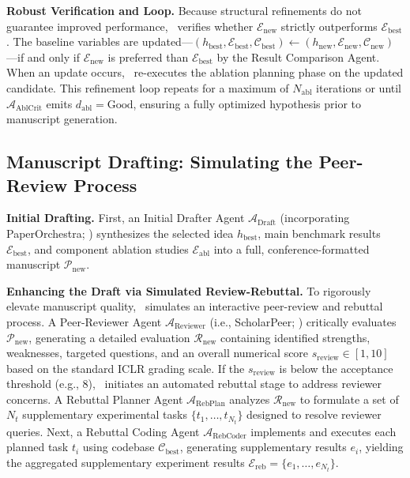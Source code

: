 \noindent\textbf{Robust Verification and Loop.}
Because structural refinements do not guarantee improved performance, \sname~verifies whether $\mathcal{E}_{\mathrm{new}}$ strictly outperforms $\mathcal{E}_{\mathrm{best}}$.
The baseline variables are updated—$(h_{\mathrm{best}}, \mathcal{E}_{\mathrm{best}}, \mathcal{C}_{\mathrm{best}}) \leftarrow (h_{\mathrm{new}}, \mathcal{E}_{\mathrm{new}}, \mathcal{C}_{\mathrm{new}})$—if and only if $\mathcal{E}_{\mathrm{new}}$ is preferred than $\mathcal{E}_{\mathrm{best}}$ by the Result Comparison Agent.
When an update occurs, \sname~re-executes the ablation planning phase on the updated candidate.
This refinement loop repeats for a maximum of $N_{\mathrm{abl}}$ iterations or until $\mathcal{A}_{\mathrm{AblCrit}}$ emits $d_{\mathrm{abl}} = \mathrm{Good}$, ensuring a fully optimized hypothesis prior to manuscript generation.


\subsection{Manuscript Drafting: Simulating the Peer-Review Process}\label{subsec:drafting_paper}
\noindent\textbf{Initial Drafting.}
First, an Initial Drafter Agent $\mathcal{A}_{\mathrm{Draft}}$ (incorporating PaperOrchestra; \citealp{song2026paperorchestra}) synthesizes the selected idea $h_{\mathrm{best}}$, main benchmark results $\mathcal{E}_{\mathrm{best}}$, and component ablation studies $\mathcal{E}_{\mathrm{abl}}$ into a full, conference-formatted manuscript $\mathcal{P}_{\mathrm{new}}$.

\noindent\textbf{Enhancing the Draft via Simulated Review-Rebuttal.}
To rigorously elevate manuscript quality, \sname~simulates an interactive peer-review and rebuttal process.
A Peer-Reviewer Agent $\mathcal{A}_{\mathrm{Reviewer}}$ (i.e., ScholarPeer; \citealp{goyal2026scholarpeer}) critically evaluates $\mathcal{P}_{\mathrm{new}}$, generating a detailed evaluation $\mathcal{R}_{\mathrm{new}}$ containing identified strengths, weaknesses, targeted questions, and an overall numerical score $s_\mathrm{review} \in [1, 10]$ based on the standard ICLR grading scale.
If the $s_\mathrm{review}$ is below the acceptance threshold (e.g., 8), \sname~initiates an automated rebuttal stage to address reviewer concerns.
A Rebuttal Planner Agent $\mathcal{A}_{\mathrm{RebPlan}}$ analyzes $\mathcal{R}_{\mathrm{new}}$ to formulate a set of $N_t$ supplementary experimental tasks $\{t_1, \dots, t_{N_t}\}$ designed to resolve reviewer queries.
Next, a Rebuttal Coding Agent $\mathcal{A}_{\mathrm{RebCoder}}$ implements and executes each planned task $t_i$ using codebase $\mathcal{C}_{\mathrm{best}}$, generating supplementary results $e_i$,
yielding the aggregated supplementary experiment results $\mathcal{E}_{\mathrm{reb}} = \{e_1, \dots, e_{N_t}\}$.

